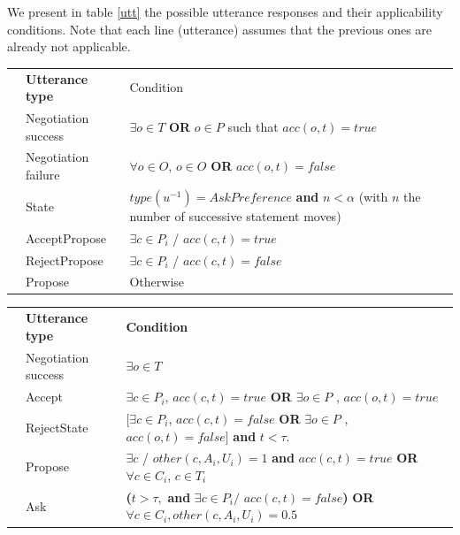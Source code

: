 \documentclass{llncs}
\begin{document}
	We present in table \ref{utt} the possible utterance responses and their applicability conditions. Note that each line (utterance) assumes that the previous ones are already not applicable.%
	
	
	\begin{table} [t]
	\centering
	\begin{tabular}{|p{.45cm}|p{3cm}|p{8cm}|}
	\hline
	\parbox[t]{2mm}{}&\textbf{Utterance type} & Condition \\
	&Negotiation success & $\exists o \in T$   \textbf{ OR } $o \in P$ such that  $acc(o,t) = true$ \\
	& Negotiation failure & $ \forall o \in O$,  $o \in O$  \textbf{ OR } $acc(o,t) = false$\\
	& State & $type(u^{-1}) = AskPreference$  \textbf{ and }
	$n < \alpha$ \newline(with $n$ the number of successive statement moves)\\
	& AcceptPropose & $\exists c \in P_i$ / $acc(c,t)= true$ \\
	& RejectPropose & $\exists c \in P_i$ / $acc(c,t)= false$ \\
	& Propose & Otherwise  \\
	
	\hline
	\end{tabular}

	\begin{tabular}{|p{.45cm}|p{3cm}|p{8cm}|}
	\hline
	\parbox[t]{2mm}{
	} & \textbf{Utterance type} & \textbf{Condition} \\
	& Negotiation success &  $\exists o \in T$ \\
	& Accept & $\exists c \in P_i$, $acc(c, t)=true $  \textbf{ OR } $ \exists o \in P$ ,  $acc(o, t) =true$ \\
	& RejectState & $ [\exists c \in P_i$, $acc(c, t)= false $ 
	\newline \textbf{ OR }$ \exists o \in P$ ,  $acc(o, t)=false]$  \textbf{and} $t<\tau$.\\
	& Propose & $\exists c$ / $other(c, A_i, U_i)  = 1 $  \textbf{ and }$acc(c, t)=true$
	\newline \textbf{ OR }  $\forall c \in C_i$,  $c \in T_i$\\
	& Ask &  \textbf{(}$t> \tau,$ \textbf{ and } 
	$\exists c \in P_i /$
	$ acc(c, t)=false$\textbf{) }
	\newline \textbf{OR}  $ \forall c \in C_i,other(c, A_i, U_i)=0.5$ \\
	

\end{tabular}
\end{table}
\end{document}
